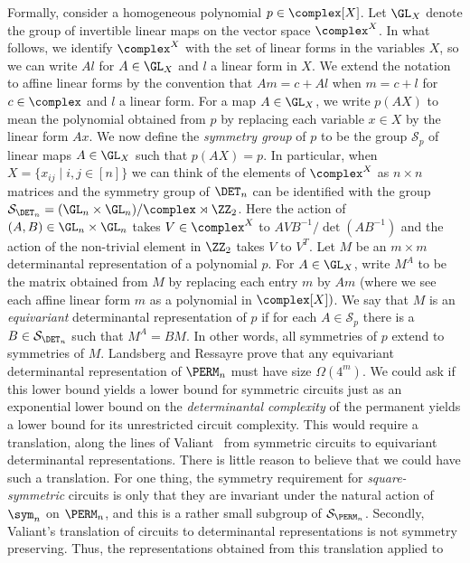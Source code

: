 \documentclass{toc}
\begin{document}
Formally, consider a homogeneous polynomial $p \in \complex[X]$.  Let
$\GL_X$ denote the group of invertible linear maps on the vector space
$\complex^X$.  In what follows, we identify $\complex^X$ with the set
of linear forms in the variables $X$, so we can write $Al$ for
$A \in \GL_X$ and $l$ a linear form in $X$.  We extend the notation to
affine linear forms %
%
by the convention that $Am = c + Al$ when $m = c+
l$ for $c \in \complex$ and $l$ a linear form.
For a map $A \in \GL_X$, we write $p(AX)$ to mean the polynomial obtained from $p$ by replacing each variable $x \in X$ by the linear form $Ax$.  We now define the \emph{symmetry group} of $p$ to be the group $\mathcal{S}_p$ of linear maps $A \in \GL_X$ such that $p(AX) = p$.  In particular, when $X = \{x_{ij} \mid i,j \in [n] \}$ we can think of the elements of $\complex^X$ as $n \times n$ matrices and the symmetry group of $\DET_n$ can be identified with the group $\mathcal{S}_{\DET_n} = (\GL_n \times \GL_n)/\complex \rtimes \ZZ_2$.  Here the action of $(A,B) \in  \GL_n \times \GL_n$ takes $V \in \complex^X$ to $AVB^{-1}/\det(AB^{-1})$ and the action of the non-trivial element in $\ZZ_2$ takes $V$ to $V^T$.
Let  $M$ be an $m\times m$ determinantal representation of a polynomial $p$.  For $A \in \GL_X$, write $M^A$ to be the matrix obtained from $M$ by replacing each entry $m$ by $Am$ (where we see each affine linear form $m$ as a polynomial in $\complex[X])$.   We say that $M$ is an \emph{equivariant} determinantal representation of $p$ if for each $A \in \mathcal{S}_p$ there is a $B \in \mathcal{S}_{\DET_n}$ such that $M^A = BM$.  In other words, all symmetries of $p$ extend to symmetries of $M$.    Landsberg and Ressayre prove that any equivariant determinantal representation of $\PERM_n$ must have size $\Omega(4^m)$.
We could ask if this lower bound yields a lower bound for symmetric circuits just as an exponential lower bound on the \emph{determinantal complexity} of the permanent yields a lower bound for its unrestricted circuit complexity.  This would require a translation, along the lines of Valiant~\cite{Valiant79} from symmetric circuits to equivariant determinantal representations.  There is little reason to believe that we could have such a translation.  For one thing, the symmetry requirement for
\emph{square-symmetric} %
circuits is only that they are invariant under the natural action of $\sym_n$ on $\PERM_n$, and this is a rather small subgroup of $\mathcal{S}_{\PERM_n}$.  Secondly, Valiant's translation of circuits to determinantal representations is not symmetry preserving.  Thus, the representations obtained from this translation applied to
\end{document}
